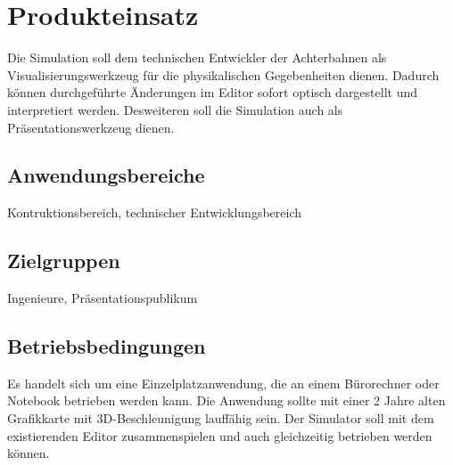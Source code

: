 
\chapter {Produkteinsatz}
Die Simulation soll dem technischen Entwickler der Achterbahnen als Visualisierungswerkzeug für die physikalischen Gegebenheiten
dienen. Dadurch können durchgeführte Änderungen im Editor sofort optisch dargestellt und interpretiert werden.
Desweiteren soll die Simulation auch als Präsentationswerkzeug dienen.


\section {Anwendungsbereiche}
Kontruktionsbereich, technischer Entwicklungsbereich

\section {Zielgruppen}
Ingenieure, Präsentationspublikum

\section {Betriebsbedingungen}
Es handelt sich um eine Einzelplatzanwendung, die an einem Bürorechner oder Notebook betrieben werden kann.
Die Anwendung sollte mit einer 2 Jahre alten Grafikkarte mit 3D-Beschleunigung lauffähig sein.
Der Simulator soll mit dem existierenden Editor zusammenspielen und auch gleichzeitig betrieben werden können.
